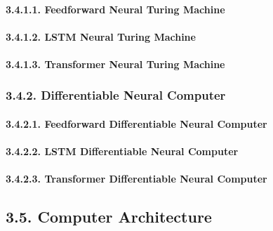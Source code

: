 \documentclass[
]{article}
\begin{document}
\hypertarget{feedforward-neural-turing-machine-1}{%
\paragraph{3.4.1.1. Feedforward Neural Turing
Machine}\label{feedforward-neural-turing-machine-1}}

\hypertarget{lstm-neural-turing-machine-1}{%
\paragraph{3.4.1.2. LSTM Neural Turing
Machine}\label{lstm-neural-turing-machine-1}}

\hypertarget{transformer-neural-turing-machine-1}{%
\paragraph{3.4.1.3. Transformer Neural Turing
Machine}\label{transformer-neural-turing-machine-1}}

\hypertarget{differentiable-neural-computer-1}{%
\subsubsection{3.4.2. Differentiable Neural
Computer}\label{differentiable-neural-computer-1}}

\hypertarget{feedforward-differentiable-neural-computer-1}{%
\paragraph{3.4.2.1. Feedforward Differentiable Neural
Computer}\label{feedforward-differentiable-neural-computer-1}}

\hypertarget{lstm-differentiable-neural-computer-1}{%
\paragraph{3.4.2.2. LSTM Differentiable Neural
Computer}\label{lstm-differentiable-neural-computer-1}}

\hypertarget{transformer-differentiable-neural-computer-1}{%
\paragraph{3.4.2.3. Transformer Differentiable Neural
Computer}\label{transformer-differentiable-neural-computer-1}}

\hypertarget{computer-architecture-1}{%
\subsection{3.5. Computer Architecture}\label{computer-architecture-1}}
\end{document}
